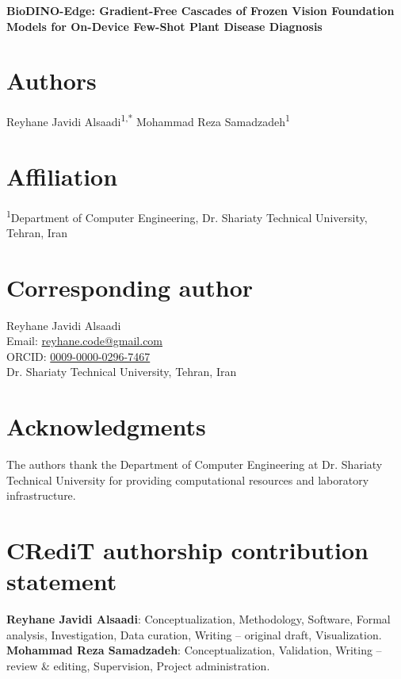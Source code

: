 \documentclass[12pt]{article}
\begin{document}
\begin{center}
{\Large\bfseries BioDINO-Edge: Gradient-Free Cascades of Frozen Vision Foundation Models for On-Device Few-Shot Plant Disease Diagnosis}
\end{center}

\vspace{1.5em}

\section*{Authors}
Reyhane Javidi Alsaadi\textsuperscript{1,*} \quad Mohammad Reza Samadzadeh\textsuperscript{1}

\section*{Affiliation}
\textsuperscript{1}Department of Computer Engineering, Dr. Shariaty Technical University, Tehran, Iran

\section*{Corresponding author}
Reyhane Javidi Alsaadi\\
Email: \href{mailto:reyhane.code@gmail.com}{reyhane.code@gmail.com}\\
ORCID: \href{https://orcid.org/0009-0000-0296-7467}{0009-0000-0296-7467}\\
Dr. Shariaty Technical University, Tehran, Iran

\section*{Acknowledgments}
The authors thank the Department of Computer Engineering at Dr. Shariaty Technical University for providing computational resources and laboratory infrastructure.

\section*{CRediT authorship contribution statement}
\textbf{Reyhane Javidi Alsaadi}: Conceptualization, Methodology, Software, Formal analysis, Investigation, Data curation, Writing -- original draft, Visualization.\\
\textbf{Mohammad Reza Samadzadeh}: Conceptualization, Validation, Writing -- review \& editing, Supervision, Project administration.
\end{document}

